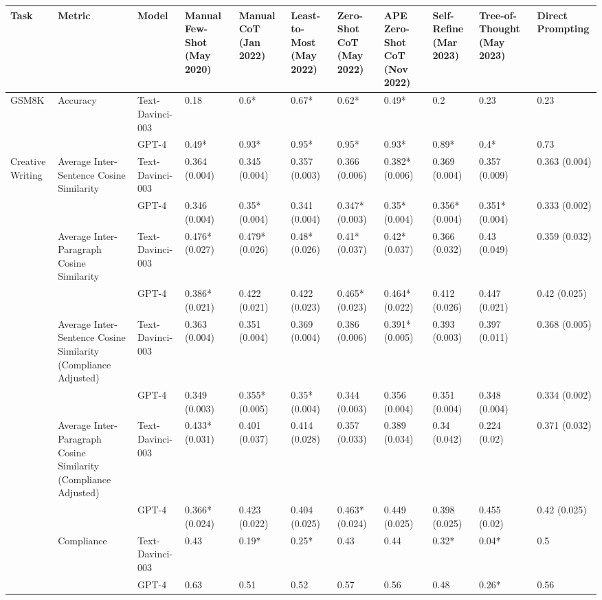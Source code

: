 \begin{tabular}{x{0.75cm}|x{1.5cm}|x{0.75cm}|x{0.75cm}|x{0.75cm}|x{0.75cm}|x{0.75cm}|x{0.75cm}|x{0.75cm}|x{0.75cm}|x{0.75cm}}
\toprule
\hline
Task & Metric & Model & Manual Few-Shot (May 2020) & Manual CoT (Jan 2022) & Least-to-Most (May 2022) & Zero-Shot CoT (May 2022) & APE Zero-Shot CoT (Nov 2022) & Self-Refine (Mar 2023) & Tree-of-Thought (May 2023) & Direct Prompting \\
\hline
\midrule
GSM8K & Accuracy & Text-Davinci-003 & 0.18 & 0.6* & 0.67* & 0.62* & 0.49* & 0.2 & 0.23 & 0.23 \\
\hline
 &  & GPT-4 & 0.49* & 0.93* & 0.95* & 0.95* & 0.93* & 0.89* & 0.4* & 0.73 \\
\hline
Creative Writing & Average Inter-Sentence Cosine Similarity & Text-Davinci-003 & 0.364 (0.004) & 0.345 (0.004) & 0.357 (0.003) & 0.366 (0.006) & 0.382* (0.006) & 0.369 (0.004) & 0.357 (0.009) & 0.363 (0.004) \\
\hline
 &  & GPT-4 & 0.346 (0.004) & 0.35* (0.004) & 0.341 (0.004) & 0.347* (0.003) & 0.35* (0.004) & 0.356* (0.004) & 0.351* (0.004) & 0.333 (0.002) \\
\hline
 & Average Inter-Paragraph Cosine Similarity & Text-Davinci-003 & 0.476* (0.027) & 0.479* (0.026) & 0.48* (0.026) & 0.41* (0.037) & 0.42* (0.037) & 0.366 (0.032) & 0.43 (0.049) & 0.359 (0.032) \\
\hline
 &  & GPT-4 & 0.386* (0.021) & 0.422 (0.021) & 0.422 (0.023) & 0.465* (0.023) & 0.464* (0.022) & 0.412 (0.026) & 0.447 (0.021) & 0.42 (0.025) \\
\hline
 & Average Inter-Sentence Cosine Similarity (Compliance Adjusted) & Text-Davinci-003 & 0.363 (0.004) & 0.351 (0.004) & 0.369 (0.004) & 0.386 (0.006) & 0.391* (0.005) & 0.393 (0.003) & 0.397 (0.011) & 0.368 (0.005) \\
\hline
 &  & GPT-4 & 0.349 (0.003) & 0.355* (0.005) & 0.35* (0.004) & 0.344 (0.003) & 0.356 (0.004) & 0.351 (0.004) & 0.348 (0.004) & 0.334 (0.002) \\
\hline
 & Average Inter-Paragraph Cosine Similarity (Compliance Adjusted) & Text-Davinci-003 & 0.433* (0.031) & 0.401 (0.037) & 0.414 (0.028) & 0.357 (0.033) & 0.389 (0.034) & 0.34 (0.042) & 0.224 (0.02) & 0.371 (0.032) \\
\hline
 &  & GPT-4 & 0.366* (0.024) & 0.423 (0.022) & 0.404 (0.025) & 0.463* (0.024) & 0.449 (0.025) & 0.398 (0.025) & 0.455 (0.02) & 0.42 (0.025) \\
\hline
 & Compliance & Text-Davinci-003 & 0.43 & 0.19* & 0.25* & 0.43 & 0.44 & 0.32* & 0.04* & 0.5 \\
\hline
 &  & GPT-4 & 0.63 & 0.51 & 0.52 & 0.57 & 0.56 & 0.48 & 0.26* & 0.56 \\
\hline
\bottomrule
\end{tabular}
